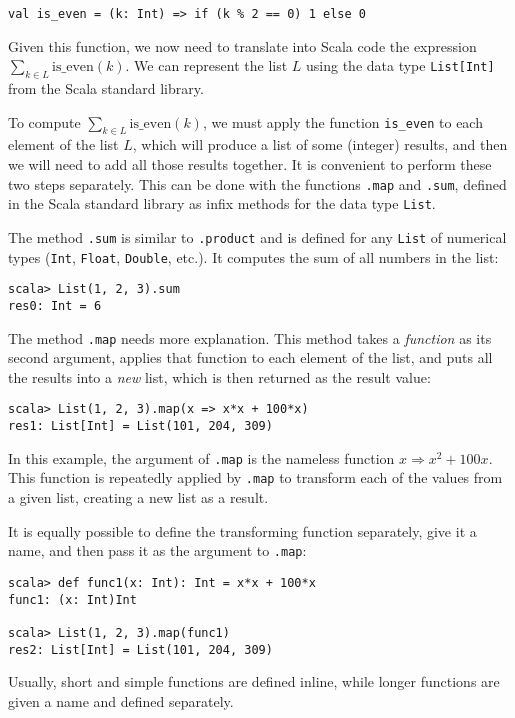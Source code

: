 \begin{lstlisting}
val is_even = (k: Int) => if (k % 2 == 0) 1 else 0
\end{lstlisting}

Given this function, we now need to translate into Scala code the
expression $\sum_{k\in L}\text{is\_even}\left(k\right)$. We can represent
the list $L$ using the data type \lstinline!List[Int]! from the
Scala standard library.

To compute $\sum_{k\in L}\text{is\_even}\left(k\right)$, we must
apply the function \texttt{}\lstinline!is_even! to each element
of the list $L$, which will produce a list of some (integer) results,
and then we will need to add all those results together. It is convenient
to perform these two steps separately. This can be done with the functions
\texttt{}\lstinline!.map! and \lstinline!.sum!, defined in the
Scala standard library as infix methods for the data type \lstinline!List!.

The method \texttt{}\lstinline!.sum! is similar to \lstinline!.product!
and is defined for any \lstinline!List! of numerical types (\lstinline!Int!,
\lstinline!Float!, \lstinline!Double!, etc.). It computes the sum
of all numbers in the list:
\begin{lstlisting}
scala> List(1, 2, 3).sum
res0: Int = 6
\end{lstlisting}

The method \texttt{}\lstinline!.map! needs more explanation. This
method takes a \emph{function} as its second argument, applies that
function to each element of the list, and puts all the results into
a \emph{new }list, which is then returned as the result value:

\begin{lstlisting}
scala> List(1, 2, 3).map(x => x*x + 100*x)
res1: List[Int] = List(101, 204, 309)
\end{lstlisting}

In this example, the argument of \lstinline!.map! is the nameless
function $x\Rightarrow x^{2}+100x$. This function is repeatedly applied
by \texttt{}\lstinline!.map! to transform each of the values from
a given list, creating a new list as a result.

It is equally possible to define the transforming function separately,
give it a name, and then pass it as the argument to \lstinline!.map!:
\begin{lstlisting}
scala> def func1(x: Int): Int = x*x + 100*x
func1: (x: Int)Int 

scala> List(1, 2, 3).map(func1)
res2: List[Int] = List(101, 204, 309)
\end{lstlisting}
Usually, short and simple functions are defined inline, while longer
functions are given a name and defined separately.

